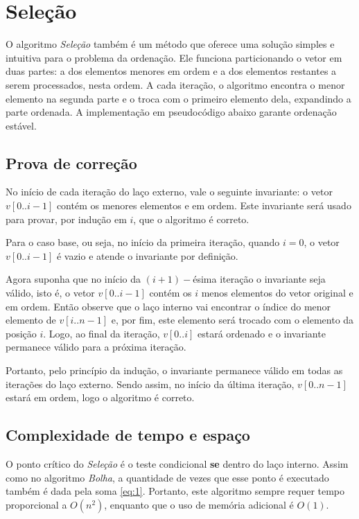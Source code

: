 \section{Seleção}
O algoritmo \textit{Seleção} também é um método que oferece uma solução simples e intuitiva para o problema da ordenação. Ele funciona particionando o vetor em duas partes: a dos elementos menores em ordem e a dos elementos restantes a serem processados, nesta ordem. A cada iteração, o algoritmo encontra o menor elemento na segunda parte e o troca com o primeiro elemento dela, expandindo a parte ordenada. A implementação em pseudocódigo abaixo garante ordenação estável.



\subsection{Prova de correção}
No início de cada iteração do laço externo, vale o seguinte invariante: o vetor $v[0..i-1]$ contém os menores elementos e em ordem. Este invariante será usado para provar, por indução em $i$, que o algoritmo é correto.

Para o caso base, ou seja, no início da primeira iteração, quando $i = 0$, o vetor $v[0..i-1]$ é vazio e atende o invariante por definição.

Agora suponha que no início da $(i+1)-$ésima iteração o invariante seja válido, isto é, o vetor $v[0..i-1]$ contém os $i$ menos elementos do vetor original e em ordem. Então observe que o laço interno vai encontrar o índice do menor elemento de $v[i..n-1]$ e, por fim, este elemento será trocado com o elemento da posição $i$. Logo, ao final da iteração, $v[0..i]$ estará ordenado e o invariante permanece válido para a próxima iteração.

Portanto, pelo princípio da indução, o invariante permanece válido em todas as iterações do laço externo. Sendo assim, no início da última iteração, $v[0..n-1]$ estará em ordem, logo o algoritmo é correto.

\subsection{Complexidade de tempo e espaço}
O ponto crítico do \textit{Seleção} é o teste condicional \textbf{se} dentro do laço interno. Assim como no algoritmo \textit{Bolha}, a quantidade de vezes que esse ponto é executado também é dada pela soma \ref{eq:1}. Portanto, este algoritmo sempre requer tempo proporcional a $O(n^2)$, enquanto que o uso de memória adicional é $O(1)$.
